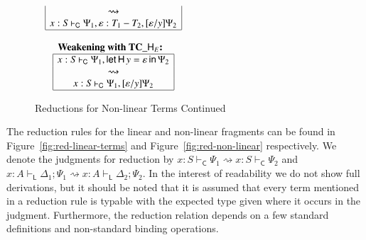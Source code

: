 \documentclass{lmcs}
\newcommand{\func}[1]{\mathsf{#1}}
\newcommand{\DualLNLLogicnt}[1]{\mathit{#1}}
\newcommand{\DualLNLLogicmv}[1]{\mathit{#1}}
\newcommand{\DualLNLLogicsym}[1]{#1}
\newcommand{\DualLNLLogicdrulename}[1]{\textsc{#1}}
\newcommand{\DualLNLLogicdruleTCXXHEName}[0]{\DualLNLLogicdrulename{TC\_HE}}
\renewcommand{\DualLNLLogicdrulename}[1]{#1}
\renewcommand{\DualLNLLogicdruleTCXXHEName}{\text{TC\_}\func{H}_E}
\begin{document}
\begin{figure}
\begin{mdframed}
\begin{center}
\begin{math}
\begin{array}{c}
\begin{array}{cc}
\begin{array}{|c|}
           \rightsquigarrow\\
            \DualLNLLogicmv{x}  :  \DualLNLLogicnt{S}  \vdash_{\mathsf{C} }  \Psi_{{\mathrm{1}}}  \DualLNLLogicsym{,}   \varepsilon   \DualLNLLogicsym{:}   \DualLNLLogicnt{T_{{\mathrm{1}}}}  -  \DualLNLLogicnt{T_{{\mathrm{2}}}}   \DualLNLLogicsym{,}  \DualLNLLogicsym{[}   \varepsilon   \DualLNLLogicsym{/}  \DualLNLLogicmv{y}  \DualLNLLogicsym{]}  \Psi_{{\mathrm{2}}} \\               
          \hline
        \end{array}
        \end{array}\\
        \\
        \begin{array}{|c|}
          \multicolumn{1}{l}{\textbf{\textbf{Weakening with $\DualLNLLogicdruleTCXXHEName{}$}:}}\\
          \hline
            \DualLNLLogicmv{x}  :  \DualLNLLogicnt{S}  \vdash_{\mathsf{C} }  \Psi_{{\mathrm{1}}}  \DualLNLLogicsym{,}   \mathsf{let}\,\mathsf{H}\, \DualLNLLogicmv{y}  =   \varepsilon  \,\mathsf{in}\, \Psi_{{\mathrm{2}}}  \\
           \rightsquigarrow\\
            \DualLNLLogicmv{x}  :  \DualLNLLogicnt{S}  \vdash_{\mathsf{C} }  \Psi_{{\mathrm{1}}}  \DualLNLLogicsym{,}  \DualLNLLogicsym{[}   \varepsilon   \DualLNLLogicsym{/}  \DualLNLLogicmv{y}  \DualLNLLogicsym{]}  \Psi_{{\mathrm{2}}} \\               
          \hline
        \end{array}
      \end{array}
    \end{math}
  \end{center}
  \end{mdframed}
  \caption{Reductions for Non-linear Terms Continued}
  \label{fig:red-non-linear-cont}
\end{figure}


The reduction rules for the linear and non-linear fragments can be
found in Figure~\ref{fig:red-linear-terms} and
Figure~\ref{fig:red-non-linear} respectively.  We denote the judgments
for reduction by $ \DualLNLLogicmv{x}  :  \DualLNLLogicnt{S}  \vdash_{\mathsf{C} }  \Psi_{{\mathrm{1}}}  \rightsquigarrow  \DualLNLLogicmv{x}  :  \DualLNLLogicnt{S}  \vdash_{\mathsf{C} }  \Psi_{{\mathrm{2}}} $ and $ \DualLNLLogicmv{x}  :  \DualLNLLogicnt{A}  \vdash_{\mathsf{L} }  \Delta_{{\mathrm{1}}} ; \Psi_{{\mathrm{1}}}  \rightsquigarrow  \DualLNLLogicmv{x}  :  \DualLNLLogicnt{A}  \vdash_{\mathsf{L} }  \Delta_{{\mathrm{2}}} ; \Psi_{{\mathrm{2}}} $.  In the interest of readability we do not show full
derivations, but it should be noted that it is assumed that every term
mentioned in a reduction rule is typable with the expected type given
where it occurs in the judgment.  Furthermore, the reduction relation
depends on a few standard definitions and non-standard binding operations.
\end{document}
